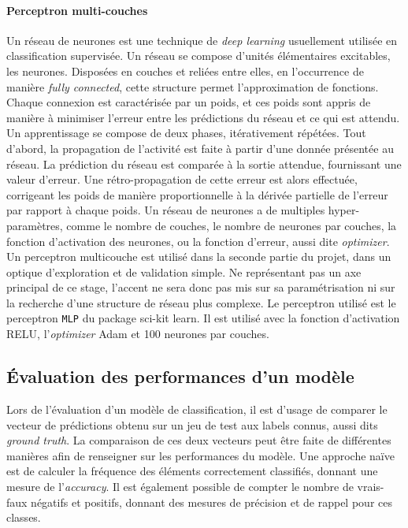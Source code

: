 \documentclass[french]{llncs}
\begin{document}
\paragraph{Perceptron multi-couches} Un réseau de neurones est une technique de \textit{deep learning} usuellement utilisée en classification supervisée. Un réseau se compose d'unités élémentaires excitables, les neurones. Disposées en couches et reliées entre elles, en l'occurrence de manière \textit{fully connected}, cette structure permet l'approximation de fonctions. Chaque connexion est caractérisée par un poids, et ces poids sont appris de manière à minimiser l'erreur entre les prédictions du réseau et ce qui est attendu. Un apprentissage se compose de deux phases, itérativement répétées. Tout d'abord, la propagation de l'activité est faite à partir d'une donnée présentée au réseau. La prédiction du réseau est comparée à la sortie attendue, fournissant une valeur d'erreur. Une rétro-propagation de cette erreur est alors effectuée, corrigeant les poids de manière proportionnelle à la dérivée partielle de l'erreur par rapport à chaque poids. Un réseau de neurones a de multiples hyper-paramètres, comme le nombre de couches, le nombre de neurones par couches, la fonction d'activation des neurones, ou la fonction d'erreur, aussi dite \textit{optimizer}.
Un perceptron multicouche est utilisé dans la seconde partie du projet, dans un optique d'exploration et de validation simple. Ne représentant pas un axe principal de ce stage, l'accent ne sera donc pas mis sur sa paramétrisation ni sur la recherche d'une structure de réseau plus complexe. Le perceptron utilisé est le perceptron \texttt{MLP} du package sci-kit learn. Il est utilisé avec la fonction d'activation RELU, l'\textit{optimizer} Adam et 100 neurones par couches.

\subsection{Évaluation des performances d'un modèle}\label{section:auc}

Lors de l'évaluation d'un modèle de classification, il est d'usage de comparer le vecteur de prédictions obtenu sur un jeu de test aux labels connus, aussi dits \textit{ground truth}. La comparaison de ces deux vecteurs peut être faite de différentes manières afin de renseigner sur les performances du modèle. Une approche naïve est de calculer la fréquence des éléments correctement classifiés, donnant une mesure de l'\textit{accuracy}. Il est également possible de compter le nombre de vrais-faux négatifs et positifs, donnant des mesures de précision et de rappel pour ces classes.
\end{document}
